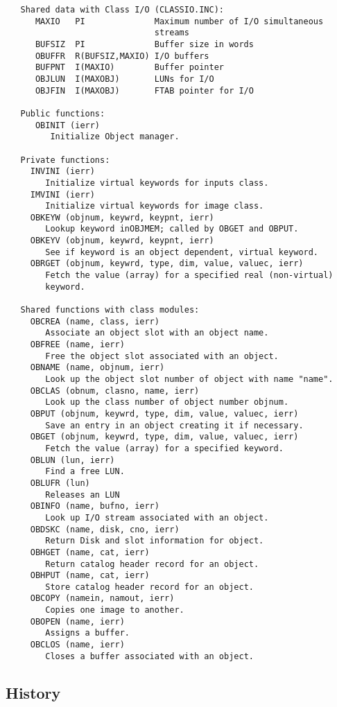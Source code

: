 {\begin{verbatim}
   Shared data with Class I/O (CLASSIO.INC):
      MAXIO   PI              Maximum number of I/O simultaneous
                              streams
      BUFSIZ  PI              Buffer size in words
      OBUFFR  R(BUFSIZ,MAXIO) I/O buffers
      BUFPNT  I(MAXIO)        Buffer pointer
      OBJLUN  I(MAXOBJ)       LUNs for I/O
      OBJFIN  I(MAXOBJ)       FTAB pointer for I/O

   Public functions:
      OBINIT (ierr)
         Initialize Object manager.

   Private functions:
     INVINI (ierr)
        Initialize virtual keywords for inputs class.
     IMVINI (ierr)
        Initialize virtual keywords for image class.
     OBKEYW (objnum, keywrd, keypnt, ierr)
        Lookup keyword inOBJMEM; called by OBGET and OBPUT.
     OBKEYV (objnum, keywrd, keypnt, ierr)
        See if keyword is an object dependent, virtual keyword.
     OBRGET (objnum, keywrd, type, dim, value, valuec, ierr)
        Fetch the value (array) for a specified real (non-virtual)
        keyword.

   Shared functions with class modules:
     OBCREA (name, class, ierr)
        Associate an object slot with an object name.
     OBFREE (name, ierr)
        Free the object slot associated with an object.
     OBNAME (name, objnum, ierr)
        Look up the object slot number of object with name "name".
     OBCLAS (obnum, clasno, name, ierr)
        Look up the class number of object number objnum.
     OBPUT (objnum, keywrd, type, dim, value, valuec, ierr)
        Save an entry in an object creating it if necessary.
     OBGET (objnum, keywrd, type, dim, value, valuec, ierr)
        Fetch the value (array) for a specified keyword.
     OBLUN (lun, ierr)
        Find a free LUN.
     OBLUFR (lun)
        Releases an LUN
     OBINFO (name, bufno, ierr)
        Look up I/O stream associated with an object.
     OBDSKC (name, disk, cno, ierr)
        Return Disk and slot information for object.
     OBHGET (name, cat, ierr)
        Return catalog header record for an object.
     OBHPUT (name, cat, ierr)
        Store catalog header record for an object.
     OBCOPY (namein, namout, ierr)
        Copies one image to another.
     OBOPEN (name, ierr)
        Assigns a buffer.
     OBCLOS (name, ierr)
        Closes a buffer associated with an object.
\end{verbatim}}
\subsection{History}

